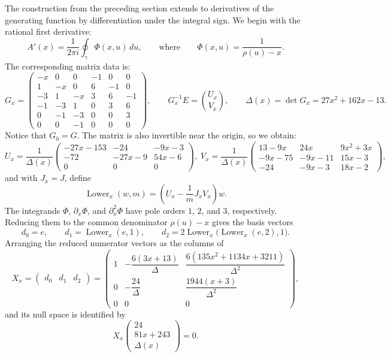 \documentclass[11pt,fleqn]{article}
\theoremstyle{plain}
\newcommand{\dd}{\,d}
\begin{document}
	The construction from the preceding section extends to derivatives
	of the generating function by differentiation under the integral sign. We begin
	with the rational first derivative: 
	\[
	A'(x)=\frac{1}{2\pi i}\oint_\gamma \Phi(x,u)\dd u,
	\qquad \text{where} \qquad 
	\Phi(x,u)=\frac1{\rho(u)-x}.
	\]
	The corresponding matrix data is: 
	\[
	G_x=
	\begin{pmatrix}
		-x&0&0&-1&0&0\\
		1&-x&0&6&-1&0\\
		-3&1&-x&3&6&-1\\
		-1&-3&1&0&3&6\\
		0&-1&-3&0&0&3\\
		0&0&-1&0&0&0
	\end{pmatrix},
	\qquad
	G_x^{-1}E=\binom{U_x}{V_x},
	\qquad
	\Delta(x)=\det G_x=27x^2+162x-13.
	\]
	Notice that $G_0=G$. The matrix is also invertible near the origin, so we obtain:  
	\[
	\!\! U_x=\frac1{\Delta(x)}
	\begin{pmatrix}
		-27x-153&-24&-9x-3\\
		-72&-27x-9&54x-6\\
		0&0&0
	\end{pmatrix},
	\;
	V_x=\frac1{\Delta(x)}
	\begin{pmatrix}
		13-9x&24x&9x^2+3x\\
		-9x-75&-9x-11&15x-3\\
		-24&-9x-3&18x-2
	\end{pmatrix},
	\]
	and with $J_x=J$, define
	\[
	\operatorname{Lower}_x(w,m)
	=
	\left(U_x-\frac1mJ_xV_x\right)w.
	\]
	The integrands $\Phi$, $\partial_x\Phi$, and $\partial_x^2\Phi$ have
	pole orders $1$, $2$, and $3$, respectively. Reducing them to the common
	denominator $\rho(u)-x$ gives the basis vectors 
	\[
	d_0=e,
	\qquad
	d_1=\operatorname{Lower}_x(e,1),
	\qquad
	d_2=
	2\operatorname{Lower}_x
	\bigl(\operatorname{Lower}_x(e,2),1\bigr).
	\]
	Arranging the reduced numerator vectors as the columns of
	\[
	X_x=
	\begin{pmatrix}
		d_0&d_1&d_2
	\end{pmatrix}
	= \begin{pmatrix}
		1&
		-\dfrac{6(3x+13)}{\Delta}&
		\dfrac{6(135x^2+1134x+3211)}{\Delta^2}
		\\[7pt]
		0&
		-\dfrac{24}{\Delta}&
		\dfrac{1944(x+3)}{\Delta^2}
		\\[7pt]
		0&0&0
	\end{pmatrix},
	\]
	and its null space is identified by
	\[
	X_x
	\begin{pmatrix}
		24\\
		81x+243\\
		\Delta(x)
	\end{pmatrix}
	=0.
	\]
\end{document}
